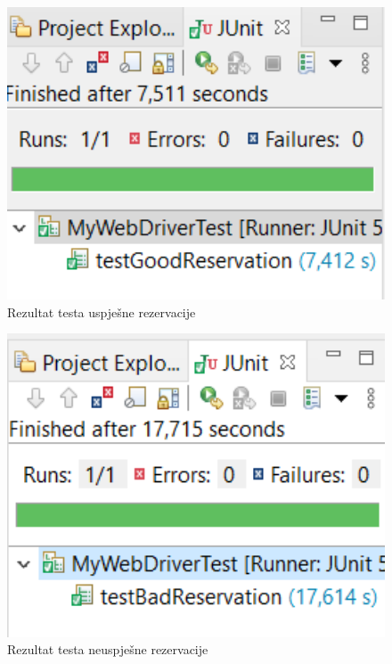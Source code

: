 \begin{flushleft}
			\begin{figure}[hp]
                    \centering
                    \includegraphics[width=15cm]{slike/reservationgood.png}
                    \caption{Rezultat testa uspješne rezervacije}
                    \label{fig:useCase-2}
                \end{figure}
			\eject
			
			\begin{figure}[hp]
                    \centering
                    \includegraphics[width=15cm]{slike/reservationbad.png}
                    \caption{Rezultat testa neuspješne rezervacije}
                    \label{fig:useCase-2}
                \end{figure}
			\eject
			

\end{flushleft}
